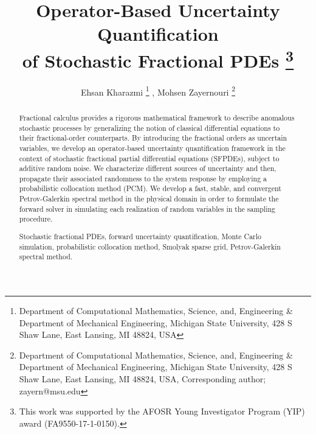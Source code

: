 \documentclass[final]{siamart1116}
\title{Operator-Based Uncertainty Quantification \\ of Stochastic Fractional PDEs \thanks{This work was supported by the AFOSR Young Investigator Program (YIP) award (FA9550-17-1-0150).}}
\author{
	Ehsan Kharazmi
	\footnote{D\lowercase{epartment of} C\lowercase{omputational} M\lowercase{athematics}, S\lowercase{cience}, \lowercase{and}, E\lowercase{ngineering} \& D\lowercase{epartment of} M\lowercase{echanical} E\lowercase{ngineering},	
		M\lowercase{ichigan} S\lowercase{tate} U\lowercase{niversity}, 428 S S\lowercase{haw} L\lowercase{ane}, E\lowercase{ast} L\lowercase{ansing}, MI 48824, USA}
	, Mohsen Zayernouri
	\footnote{D\lowercase{epartment of} C\lowercase{omputational} M\lowercase{athematics}, S\lowercase{cience}, \lowercase{and}, E\lowercase{ngineering} \&
		D\lowercase{epartment of} M\lowercase{echanical} E\lowercase{ngineering},	
		M\lowercase{ichigan} S\lowercase{tate} U\lowercase{niversity}, 428 S S\lowercase{haw} L\lowercase{ane}, E\lowercase{ast} L\lowercase{ansing}, MI 48824, USA,  C\lowercase{orresponding author; zayern@msu.edu}}
}
\numberwithin{equation}{section}
\begin{document}
\maketitle
%
\begin{abstract}
%
Fractional calculus provides a rigorous mathematical framework to describe anomalous stochastic processes by generalizing the notion of classical differential equations to their fractional-order counterparts. By introducing the fractional orders as uncertain variables, we develop an operator-based uncertainty quantification framework in the context of stochastic fractional partial differential equations (SFPDEs), subject to additive random noise. We characterize different sources of uncertainty and then, propagate their associated randomness to the system response by employing a probabilistic collocation method (PCM). We develop a fast, stable, and convergent Petrov-Galerkin spectral method in the physical domain in order to formulate the forward solver in simulating each realization of random variables in the sampling procedure.
%

%
\begin{keywords}
%
Stochastic fractional PDEs, forward uncertainty quantification, Monte Carlo simulation, probabilistic collocation method, Smolyak sparse grid, Petrov-Galerkin spectral method.
%
\end{keywords}
%
\end{abstract}
%
%




\pagestyle{myheadings}
\thispagestyle{plain}












\end{document}

